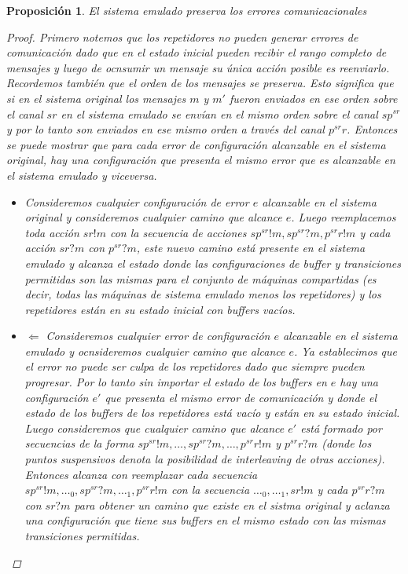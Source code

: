 \documentclass[paper=a4, fontsize=11pt, spanish]{scrartcl} %
\numberwithin{equation}{section} %
\numberwithin{figure}{section} %
\numberwithin{table}{section} %
\newtheorem{prop}{Proposición}
\begin{document}
\begin{prop} El sistema emulado preserva los errores comunicacionales

\begin{proof} Primero notemos que los repetidores no pueden generar errores de comunicación dado que en el estado inicial pueden recibir el rango completo de mensajes y luego de ocnsumir un mensaje su única acción posible es reenviarlo. Recordemos también que el orden de los mensajes se preserva. Esto significa que si en el sistema original los mensajes $ m $ y $m'$ fueron enviados en ese orden sobre el canal $sr$ en el sistema emulado se envían en el mismo orden sobre el canal $sp^{sr}$ y por lo tanto son enviados en ese mismo orden a través del canal $p^{sr}r$. Entonces se puede mostrar que para cada error de configuración alcanzable en el sistema original, hay una configuración que presenta el mismo error que es alcanzable en el sistema emulado y viceversa.
\begin{itemize}
\item[$\Rightarrow$] Consideremos cualquier configuración de error $e$ alcanzable en el sistema original y consideremos cualquier camino que alcance $e$. Luego reemplacemos toda acción $sr!m$ con la secuencia de acciones $sp^{sr}!m, sp^{sr}?m, p^{sr}r!m$ y cada acción $sr?m$ con $p^{sr}?m$, este nuevo camino está presente en el sistema emulado y alcanza el estado donde las configuraciones de buffer y transiciones permitidas son las mismas para el conjunto de máquinas compartidas (es decir, todas las máquinas de sistema emulado menos los repetidores) y los repetidores están en su estado inicial con buffers vacíos.
\item$\Leftarrow$ Consideremos cualquier error de configuración $e$ alcanzable en el sistema emulado y ocnsideremos cualquier camino que alcance $e$. Ya establecimos que el error no puede ser culpa de los repetidores dado que siempre pueden progresar. Por lo tanto sin importar el estado de los buffers en $e$ hay una configuración $e'$ que presenta el mismo error de comunicación y donde el estado de los buffers de los repetidores está vacío y están en su estado inicial. Luego consideremos que cualquier camino que alcance $e'$ está formado por secuencias de la forma $sp^{sr}!m,\ldots, sp^{sr}?m, \ldots, p^{sr}r!m$ y $p^{sr}r?m$ (donde los puntos suspensivos denota la posibilidad de interleaving de otras acciones). Entonces alcanza con reemplazar cada secuencia $sp^{sr}!m,\ldots_0, sp^{sr}?m, \ldots_1, p^{sr}r!m$ con la secuencia $\ldots_0,\ldots_1, sr!m$ y cada $p^{sr}r?m$ con $sr?m$ para obtener un camino que existe en el sistma original y aclanza una configuración que tiene sus buffers en el mismo estado con las mismas transiciones permitidas.
\end{itemize}

\end{proof}

\end{prop}
\end{document}
